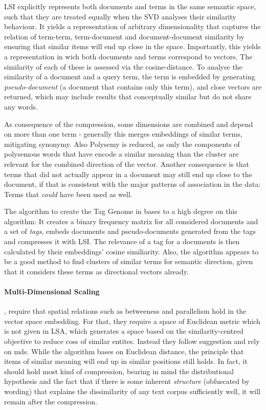 LSI explicitly represents both documents and terms in the same semantic space, such that they are treated equally when the SVD analyses their similarity behaviour. It yields a representation of arbitrary dimensionality that captures the relation of term-term, term-document and document-document similarity by ensuring that similar items will end up close in the space. Importantly, this yields a representation in wich both documents and terms correspond to vectors. The similarity of each of these is assessed via the cosine-distance. To analyse the similarity of a document and a query term, the term is embedded by generating \textit{pseudo-document} (a document that contains only this term), and close vectors are returned, which may include results that conceptually similar but do not share any words. 

As consequence of the compression, some dimensions are combined and depend on more than one term - generally this merges embeddings of similar terms, mitigating synonymy. Also Polysemy is reduced, as only the components of polysemous words that have encode a similar meaning than the cluster are relevant for the combined direction of the vector. Another consequence is that terms that did not actually appear in a document may still end up close to the document, if that is consistent with the major patterns of association in the data: Terms that \textit{could} have been used as well.

The algorithm to create the Tag Genome in \cite{VISR12} bases to a high degree on this algorithm: It creates a binary frequency matrix for all considered documents and a set of \textit{tags}, embeds documents and pseudo-documents generated from the tags and compresses it with LSI. The relevance of a tag for a documents  is then calculated by their embeddings' cosine similiarity. Also, the algorithm appears to be a good method to find clusters of similar terms for semantic direction, given that it considers these terms as directional vectors already. 

\paragraph*{Multi-Dimensional Scaling}
\label{sec:mds}

\textcite{Derrac2015}, require that spatial relations such as betweeness and parallelism hold in the vector space embedding. For that, they require a space of Euclidean metric which is not given in LSA, which generates a space based on the similarity-centred objective to reduce \glspl{cos} of similar entites. Instead they follow \textcite{Gardenfors2000a} suggestion and rely on \gls{mds}. While the algorithm bases on Euclidean distance, the principle that items of similar meaning will end up in similar positions still holds. In fact, it should hold most kind of compression, bearing in mind the distributional hypothesis and the fact that if there is some inherent \textit{structure} (obfuscated by wording) that explains the dissimilarity of any text corpus sufficiently well, it will remain after the compression.


